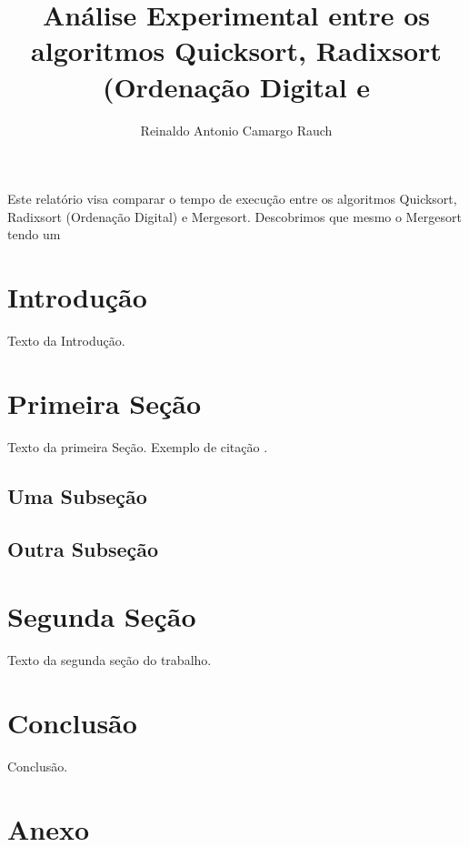 \documentclass[12pt]{article}
\title{Análise Experimental entre os algoritmos Quicksort, Radixsort (Ordenação Digital e }
\author{Reinaldo Antonio Camargo Rauch\inst{1}}
\begin{document}
 

\maketitle
     
\begin{resumo} 
  Este relatório visa comparar o tempo de execução entre os algoritmos Quicksort, Radixsort (Ordenação Digital) e Mergesort. Descobrimos que mesmo o Mergesort tendo um 
\end{resumo}

\section{Introdução}

Texto da Introdução.

\section{Primeira Seção}

Texto da primeira Seção. Exemplo de citação \cite{knuth:84}.

\subsection{Uma Subseção}

\subsection{Outra Subseção}

\section{Segunda Seção}

Texto da segunda seção do trabalho.

\section{Conclusão}

Conclusão. 




\section*{Anexo}
\end{document}

